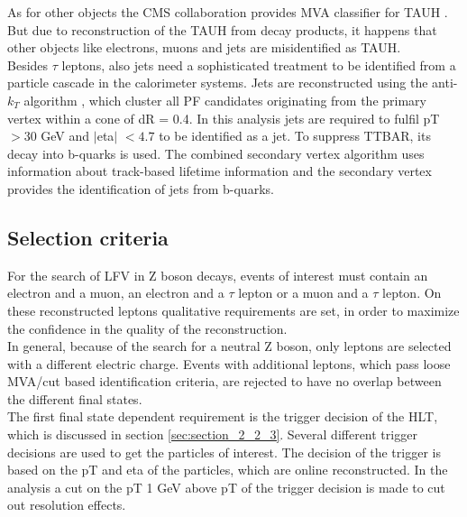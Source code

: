 As for other objects the \gls{CMS} collaboration provides \gls{MVA} classifier for \gls{TAUH} \cite{TAURECO}. But due to reconstruction of the \gls{TAUH} from decay products, it happens that other objects like electrons, muons and jets are misidentified as \gls{TAUH}.  \\

Besides $\tau$ leptons, also jets need a sophisticated treatment to be identified from a particle cascade in the calorimeter systems. Jets are reconstructed using the anti-$k_T$ algorithm \cite{ANTIKT}, which cluster all \gls{PF} candidates originating from the primary vertex within a cone of \gls{dR} = 0.4. In this analysis jets are required to fulfil \gls{pT} $> 30$ GeV and $|$\gls{eta}$|$ $ < 4.7$ to be identified as a jet. To suppress \gls{TTBAR}, its decay into b-quarks is used. The combined secondary vertex algorithm \cite{CSV} uses information about track-based lifetime information and the secondary vertex provides the identification of jets from b-quarks. 


\subsection{Selection criteria}
\label{sec:section_3_2_2}

For the search of \gls{LFV} in Z boson decays, events of interest must contain an electron and a muon, an electron and a $\tau$ lepton or a muon and a $\tau$ lepton. On these reconstructed leptons qualitative requirements are set, in order to maximize the confidence in the quality of the reconstruction. \\

In general, because of the search for a neutral Z boson, only leptons are selected with a different electric charge. Events with additional leptons, which pass loose \gls{MVA}/cut based identification criteria, are rejected to have no overlap between the different final states.  \\

The first final state dependent requirement is the trigger decision of the \gls{HLT}, which is discussed in section \ref{sec:section_2_2_3}. Several different trigger decisions are used to get the particles of interest. The decision of the trigger is based on the \gls{pT} and \gls{eta} of the particles, which are online reconstructed. In the analysis a cut on the \gls{pT} 1 GeV above \gls{pT} of the trigger decision is made to cut out resolution effects. 

